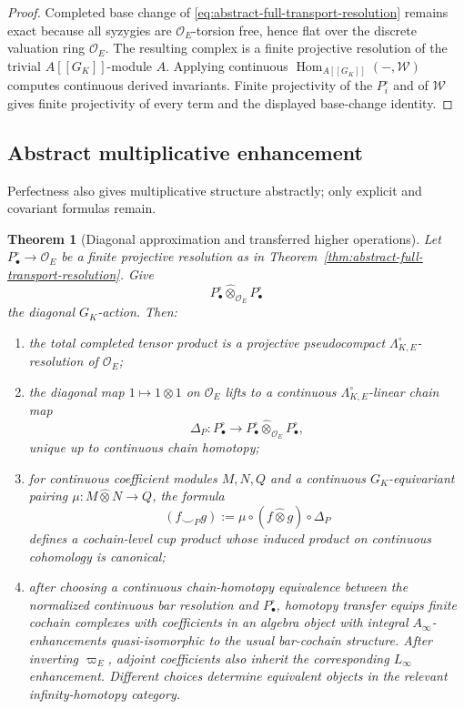 \documentclass[11pt]{article}
\newtheorem{theorem}{Theorem}[section]
\theoremstyle{definition}
\begin{document}
\begin{proof}
Completed base change of \eqref{eq:abstract-full-transport-resolution} remains exact because all syzygies are $\mathcal O_E$-torsion free, hence flat over the discrete valuation ring $\mathcal O_E$.  The resulting complex is a finite projective resolution of the trivial $A[[G_K]]$-module $A$.  Applying continuous $\operatorname{Hom}_{A[[G_K]]}(-,\mathcal W)$ computes continuous derived invariants.  Finite projectivity of the $P_i^{\circ}$ and of $\mathcal W$ gives finite projectivity of every term and the displayed base-change identity.
\end{proof}

\subsection{Abstract multiplicative enhancement}\label{subsec:abstract-multiplicative}

Perfectness also gives multiplicative structure abstractly; only explicit and covariant formulas remain.

\begin{theorem}[Diagonal approximation and transferred higher operations]\label{thm:abstract-diagonal}
Let $P_\bullet^{\circ}\to\mathcal O_E$ be a finite projective resolution as in Theorem~\ref{thm:abstract-full-transport-resolution}.  Give
\[
P_\bullet^{\circ}\widehat\otimes_{\mathcal O_E}P_\bullet^{\circ}
\]
the diagonal $G_K$-action.  Then:
\begin{enumerate}
\item the total completed tensor product is a projective pseudocompact $\Lambda_{K,E}^{\circ}$-resolution of $\mathcal O_E$;
\item the diagonal map $1\mapsto1\otimes1$ on $\mathcal O_E$ lifts to a continuous $\Lambda_{K,E}^{\circ}$-linear chain map
\begin{equation}\label{eq:abstract-diagonal}
\Delta_P:P_\bullet^{\circ}
\longrightarrow
P_\bullet^{\circ}\widehat\otimes_{\mathcal O_E}P_\bullet^{\circ},
\end{equation}
unique up to continuous chain homotopy;
\item for continuous coefficient modules $M,N,Q$ and a continuous $G_K$-equivariant pairing $\mu:M\widehat\otimes N\to Q$, the formula
\[
(f\smile_P g):=\mu\circ(f\widehat\otimes g)\circ\Delta_P
\]
defines a cochain-level cup product whose induced product on continuous cohomology is canonical;
\item after choosing a continuous chain-homotopy equivalence between the normalized continuous bar resolution and $P_\bullet^{\circ}$, homotopy transfer equips finite cochain complexes with coefficients in an algebra object with integral $A_\infty$-enhancements quasi-isomorphic to the usual bar-cochain structure.  After inverting $\varpi_E$, adjoint coefficients also inherit the corresponding $L_\infty$ enhancement.  Different choices determine equivalent objects in the relevant infinity-homotopy category.
\end{enumerate}
\end{theorem}
\end{document}
